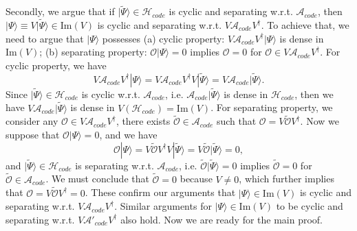 \documentclass[a4paper,11pt]{article}
\newcommand{\ket}[1]{| #1 \rangle } %
\renewcommand{\=}[1]{\stackrel{#1}{=}} %
\newcommand{\im}{\text{Im}}
\def\A{\mathcal{A}}
\def\O{\mathcal{O}}
\def\H{\mathcal{H}}
\begin{document}
Secondly, we argue that if $\ket{\widetilde{\Psi}}\in\H_{code}$ is cyclic and separating w.r.t. $\A_{code}$, then $\ket{\Psi}\equiv V\ket{\widetilde{\Psi}}\in\im(V)$ is cyclic and separating w.r.t. $V\A_{code}V^\dagger$. To achieve that, we need to argue that $\ket{\Psi}$ possesses (a) cyclic property: $V\A_{code}V^\dagger\ket{\Psi}$ is dense in $\im(V)$; (b) separating property: $\O\ket{\Psi}=0$ implies $\O=0$ for $\O\in V\A_{code}V^\dagger$. For cyclic property, we have 
\begin{equation}
	V\A_{code}V^\dagger\ket{\Psi}=V\A_{code}V^\dagger V\ket{\widetilde{\Psi}}=V\A_{code}\ket{\widetilde{\Psi}}.
\end{equation}
Since $\ket{\widetilde{\Psi}}\in\H_{code}$ is cyclic w.r.t. $\A_{code}$, i.e. $\A_{code}\ket{\widetilde{\Psi}}$ is dense in $\H_{code}$, then we have $V\A_{code}\ket{\widetilde{\Psi}}$ is dense in $V(\H_{code})=\im(V)$. For separating property, we consider any $\O\in V\A_{code}V^\dagger$, there exists $\widetilde{\O}\in \A_{code}$ such that $\O=V\widetilde{\O}V^\dagger$. Now we suppose that $\O\ket{\Psi}=0$, and we have
\begin{equation}
	\O\ket{\Psi}=V\widetilde{\O}V^\dagger V\ket{\widetilde{\Psi}}=V\widetilde{\O}\ket{\widetilde{\Psi}}=0,
\end{equation}
and $\ket{\widetilde{\Psi}}\in\H_{code}$ is separating w.r.t. $\A_{code}$, i.e. $\widetilde{\O}\ket{\widetilde{\Psi}}=0$ implies $\widetilde{\O}=0$ for $\widetilde{\O}\in \A_{code}$. We must conclude that $\widetilde{\O}=0$ because $V\neq 0$, which further implies that $\O=V\widetilde{\O}V^\dagger=0$. These confirm our arguments that $\ket{\Psi}\in\im(V)$ is cyclic and separating w.r.t. $V\A_{code}V^\dagger$. Similar arguments for $\ket{\Psi}\in\im(V)$ to be cyclic and separating w.r.t. $V\A'_{code}V^\dagger$ also hold. Now we are ready for the main proof.
\end{document}
